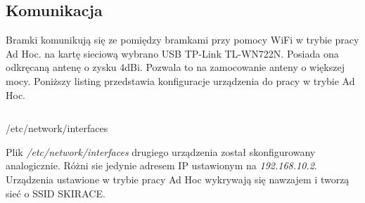\documentclass[11pt,a4paper, twoside]{article}
\begin{document}
\subsection{Komunikacja}\label{communication}
Bramki komunikują się ze pomiędzy bramkami przy pomocy WiFi w trybie pracy Ad Hoc. na kartę sieciową wybrano USB TP-Link \mbox{TL-WN722N}. Posiada ona odkręcaną antenę o zysku 4dBi. Pozwala to na zamocowanie anteny o większej mocy. Poniższy listing przedstawia konfiguracje urządzenia do pracy w trybie Ad Hoc.
\begin{listing}[H]
\inputminted[linenos=true]{sh}{./src/adhoc}
\caption{/etc/network/interfaces}
\end{listing}
Plik \emph{/etc/network/interfaces} drugiego urządzenia został skonfigurowany analogicznie. Różni sie jedynie adresem IP ustawionym na \emph{192.168.10.2}. Urządzenia ustawione w trybie pracy Ad Hoc wykrywają się nawzajem i tworzą sieć o SSID SKIRACE.
\end{document}
